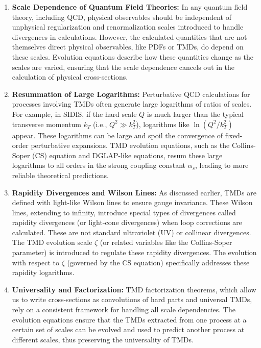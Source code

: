 \documentclass[11pt]{article}
\begin{document}
\begin{enumerate}
  \item \textbf{Scale Dependence of Quantum Field Theories:} In any quantum field theory, including QCD, physical observables should be independent of unphysical regularization and renormalization scales introduced to handle divergences in calculations. However, the calculated quantities that are not themselves direct physical observables, like PDFs or TMDs, do depend on these scales. Evolution equations describe how these quantities change as the scales are varied, ensuring that the scale dependence cancels out in the calculation of physical cross-sections.
  \item \textbf{Resummation of Large Logarithms:} Perturbative QCD calculations for processes involving TMDs often generate large logarithms of ratios of scales. For example, in SIDIS, if the hard scale $Q$ is much larger than the typical transverse momentum $k_T$ (i.e., $Q^2 \gg k_T^2$), logarithms like $\ln(Q^2/k_T^2)$ appear. These logarithms can be large and spoil the convergence of fixed-order perturbative expansions. TMD evolution equations, such as the Collins-Soper (CS) equation and DGLAP-like equations, resum these large logarithms to all orders in the strong coupling constant $\alpha_s$, leading to more reliable theoretical predictions.
  \item \textbf{Rapidity Divergences and Wilson Lines:} As discussed earlier, TMDs are defined with light-like Wilson lines to ensure gauge invariance. These Wilson lines, extending to infinity, introduce special types of divergences called rapidity divergences (or light-cone divergences) when loop corrections are calculated. These are not standard ultraviolet (UV) or collinear divergences. The TMD evolution scale $\zeta$ (or related variables like the Collins-Soper parameter) is introduced to regulate these rapidity divergences. The evolution with respect to $\zeta$ (governed by the CS equation) specifically addresses these rapidity logarithms.
  \item \textbf{Universality and Factorization:} TMD factorization theorems, which allow us to write cross-sections as convolutions of hard parts and universal TMDs, rely on a consistent framework for handling all scale dependencies. The evolution equations ensure that the TMDs extracted from one process at a certain set of scales can be evolved and used to predict another process at different scales, thus preserving the universality of TMDs.
\end{enumerate}
\end{document}
